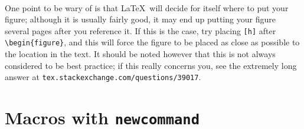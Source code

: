 \documentclass[10pt]{article}
\begin{document}
\paragraph{}
 One point to be wary of is that \LaTeX\ will decide for itself where to put your figure; although it is usually fairly good, it may end up putting your figure several pages after you reference it. If this is the case, try placing \verb$[h]$ after \verb$\begin{figure}$, and this will force the figure to be placed as close as possible to the location in the text.  It should be noted however that this is not always considered to be best practice; if this really concerns you, see the extremely long answer at \verb$tex.stackexchange.com/questions/39017$.

\section{Macros with \texttt{newcommand}}
\end{document}
